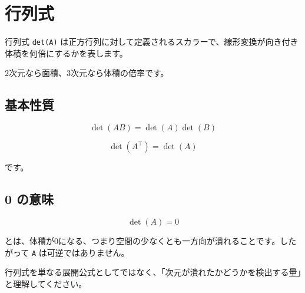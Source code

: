 \documentclass[
  11pt,
  a4paper,
]{ltjsarticle}
\author{}
\date{}
\begin{document}
\hypertarget{ux884cux5217ux5f0f}{%
\section{行列式}\label{ux884cux5217ux5f0f}}

行列式 \texttt{det(A)}
は正方行列に対して定義されるスカラーで、線形変換が向き付き体積を何倍にするかを表します。

2次元なら面積、3次元なら体積の倍率です。

\hypertarget{ux57faux672cux6027ux8cea}{%
\subsection{基本性質}\label{ux57faux672cux6027ux8cea}}

\[
\det(AB)=\det(A)\det(B)
\]

\[
\det(A^\top)=\det(A)
\]

です。

\hypertarget{ux306eux610fux5473}{%
\subsection{0 の意味}\label{ux306eux610fux5473}}

\[
\det(A)=0
\]

とは、体積が0になる、つまり空間の少なくとも一方向が潰れることです。したがって
\texttt{A} は可逆ではありません。

行列式を単なる展開公式としてではなく、「次元が潰れたかどうかを検出する量」と理解してください。
\end{document}
